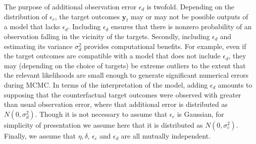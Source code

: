 \documentclass[twocolumn,10pt]{asme2ej}
\begin{document}
%
The purpose of additional observation error $\epsilon_d$ is twofold.
%
Depending on the distribution of $\epsilon_c$, the target outcomes $\mathbf y_t$ may or may not be possible outputs of a model that lacks $\epsilon_d$.
%
Including $\epsilon_d$ ensures that there is nonzero probability of an observation falling in the vicinity of the targets.
%
Secondly, including $\epsilon_d$ and estimating its variance $\sigma_d^2$ provides computational benefits.
%
For example, even if the target outcomes are compatible with a model that does not include $\epsilon_d$, they may (depending on the choice of targets) be extreme outliers to the extent that the relevant likelihoods are small enough to generate significant numerical errors during MCMC.
%
In terms of the interpretation of the model, adding $\epsilon_d$ amounts to supposing that the counterfactual target outcomes were observed with greater than usual observation error, where that additional error is distributed as $N(0,\sigma_d^2)$.
%
Though it is not necessary to assume that $\epsilon_c$ is Gaussian, for simplicity of presentation we assume here that it is distributed as $N(0,\sigma^2_c)$.
%
Finally, we assume that $\eta,\delta$, $\epsilon_c$ and $\epsilon_d$ are all mutually independent.
%
\end{document}
